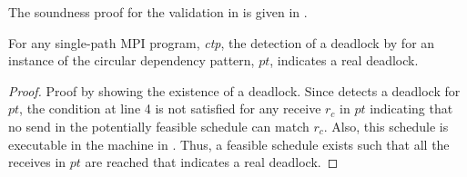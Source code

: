 
The soundness proof for the validation in  is given in .

\begin{lemma}
For any single-path MPI program, \textit{ctp}, the detection of a deadlock by  for an instance of the circular dependency pattern, $\mathit{pt}$, indicates a real deadlock. 
\label{lemma:circular}
\end{lemma}
\begin{proof}
Proof by showing the existence of a deadlock. Since  detects a deadlock for $\mathit{pt}$, the condition at line 4 is not satisfied for any receive $r_c$ in $\mathit{pt}$ indicating that no send in the potentially feasible schedule can match $r_c$. Also, this schedule is executable in the machine in . Thus, a feasible schedule exists such that all the receives in $\mathit{pt}$ are reached that indicates a real deadlock. 
\end{proof} 





